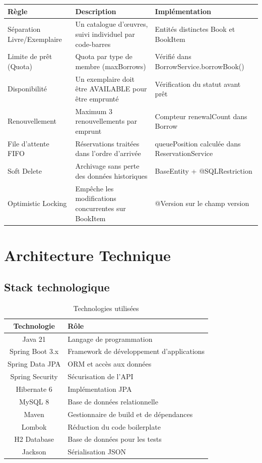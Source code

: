\documentclass[12pt,a4paper,twoside]{report}
\begin{document}
\begin{longtable}{p{4cm} p{5cm} p{5cm}}
\hline
\rowcolor[gray]{0.9}
\textbf{Règle} & \textbf{Description} & \textbf{Implémentation} \\
\hline
\endfirsthead
\hline
\endfoot
Séparation Livre/Exemplaire & Un catalogue d'œuvres, suivi individuel par code-barres & Entités distinctes Book et BookItem \\
Limite de prêt (Quota) & Quota par type de membre (maxBorrows) & Vérifié dans BorrowService.borrowBook() \\
Disponibilité & Un exemplaire doit être AVAILABLE pour être emprunté & Vérification du statut avant prêt \\
Renouvellement & Maximum 3 renouvellements par emprunt & Compteur renewalCount dans Borrow \\
File d'attente FIFO & Réservations traitées dans l'ordre d'arrivée & queuePosition calculée dans ReservationService \\
Soft Delete & Archivage sans perte des données historiques & BaseEntity + @SQLRestriction \\
Optimistic Locking & Empêche les modifications concurrentes sur BookItem & @Version sur le champ version \\
\hline
\end{longtable}

\chapter{Architecture Technique}

\section{Stack technologique}

\begin{table}[H]
\centering
\caption{Technologies utilisées}
\label{tab:stack}
\begin{tabularx}{\textwidth}{c X}
\hline
\rowcolor[gray]{0.9}
\textbf{Technologie} & \textbf{Rôle} \\
\hline
Java 21 & Langage de programmation \\
Spring Boot 3.x & Framework de développement d'applications \\
Spring Data JPA & ORM et accès aux données \\
Spring Security & Sécurisation de l'API \\
Hibernate 6 & Implémentation JPA \\
MySQL 8 & Base de données relationnelle \\
Maven & Gestionnaire de build et de dépendances \\
Lombok & Réduction du code boilerplate \\
H2 Database & Base de données pour les tests \\
Jackson & Sérialisation JSON \\
\hline
\end{tabularx}
\end{table}
\end{document}
